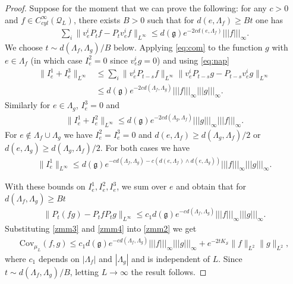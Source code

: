 \documentclass[11pt,UTF-8,reqno]{amsart}
\numberwithin{equation}{section}
\def\${|\!|\!|}
\def\cov{{\mathrm{Cov}}}
\def\cQ{{\mathcal Q}}
\def\cS{{\mathcal S}}
\def\geq{\geqslant}
\def\leq{\leqslant}
\def\mfg{\mathfrak{g}}
\def\geq{\geqslant}
\def\leq{\leqslant}
\def\dg{d(\mfg)}
\begin{document}
\begin{proof}
	Suppose for the moment that we can prove the following:  for any $c>0$ and $f\in C^\infty_{cyl}(\cQ_L)$, there exists $B>0$ such that for $d(e,\Lambda_f)\geq Bt$  one has
	\begin{align}\label{eq:com}
		\sum_i\|v_e^iP_{t }f-P_{t}v_e^i f\|_{L^\infty}\leq \dg e^{-2cd(e,\Lambda_f)}\$ f \$_\infty.
	\end{align}
	We choose $t\sim d(\Lambda_f,\Lambda_g)/B$ below. Applying \eqref{eq:com}  to the function $g$
	with $e\in \Lambda_f$ (in which case $I_e^2=0$ since $v_e^i g=0$) and using \eqref{eq:nap}
	\begin{align*}
		\|I_e^1+I_e^3\|_{L^\infty}
		&\leq \sum_i\|v_e^iP_{t-s}f\|_{L^\infty}\|v_e^iP_{t-s}g-P_{t-s}v_e^ig\|_{L^\infty}
		\\
		&\leq \dg e^{-2cd(\Lambda_f,\Lambda_g)} \$ f \$_{\infty}\$ g \$_\infty.
	\end{align*}
	Similarly for $e\in \Lambda_g$, $I_e^3=0$ and
	\begin{align*}
		\|I_e^1+I_e^2\|_{L^\infty}\leq  \dg e^{-2cd(\Lambda_g,\Lambda_f)} \$ g \$_{\infty}\$ f \$_{\infty}.
	\end{align*}
	For $e\notin \Lambda_f\cup \Lambda_g$ we have $I_e^2=I_e^3=0$ and
	$d(e,\Lambda_f)\geq d(\Lambda_g,\Lambda_f)/2$ or $d(e,\Lambda_g)\geq d(\Lambda_g,\Lambda_f)/2$. For both cases we have
	\begin{align*}
		\|I_e^1\|_{L^\infty}%
		\leq \dg e^{-cd(\Lambda_f,\Lambda_g)-c(d(e,\Lambda_f)\wedge d(e,\Lambda_g))} \$ f \$_{\infty}\$ g \$_{\infty}.
	\end{align*}
	
	With these bounds on $I_e^{1},I_e^{2},I_e^{3}$, we sum over $e$ and obtain that for $d(\Lambda_f,\Lambda_g)\geq Bt$
	\begin{align}\label{zmm4}
		\|	P_t(fg)-P_tf P_tg\|_{L^\infty}\leq c_1 \dg e^{-cd(\Lambda_f,\Lambda_g)}\$ f \$_{\infty}\$ g \$_{\infty}.
	\end{align}
	Substituting \eqref{zmm3} and \eqref{zmm4} into \eqref{zmm2} we get
	\begin{align*}
		\cov_{\mu_L}(f,g)
		\leq c_1 \dg e^{-cd(\Lambda_f,\Lambda_g)}\$ f \$_{\infty}\$ g \$_{\infty}+	e^{-2tK_\cS}\|f\|_{L^2}\|g\|_{L^2},
	\end{align*}
where $c_1$ depends on $|\Lambda_f|$ and $|\Lambda_g|$ and is independent of $L$.
	Since  $t\sim d(\Lambda_f,\Lambda_g)/B$, letting $L\to\infty$ the result follows.
	

\end{proof}
\end{document}
